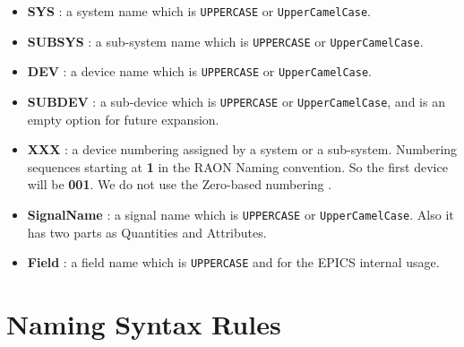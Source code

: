 \documentclass[11pt
  , a4paper
  , article
  , oneside
]{memoir}
\begin{document}
\begin{itemize}
\item \textbf{SYS}    : a system name which is \texttt{UPPERCASE} or \texttt{UpperCamelCase}. 
\item \textbf{SUBSYS} : a sub-system name which is \texttt{UPPERCASE} or \texttt{UpperCamelCase}. 
\item \textbf{DEV} : a device name which is \texttt{UPPERCASE} or \texttt{UpperCamelCase}.
\item \textbf{SUBDEV} : a sub-device which is \texttt{UPPERCASE} or \texttt{UpperCamelCase}, and is an empty option for future expansion.
\item \textbf{XXX}  : a device numbering assigned by a system or a sub-system. Numbering sequences starting at \textbf{1} in the RAON Naming convention. So the first device will be \textbf{001}. We do not use the Zero-based numbering \cite{ZERONUM}. 
\item \textbf{SignalName} : a signal name which is \texttt{UPPERCASE} or \texttt{UpperCamelCase}. Also it has two parts as Quantities and Attributes.
\item \textbf{Field} : a field name which is \texttt{UPPERCASE} and for the EPICS internal usage.
\end{itemize}

 
\chapter{Naming Syntax Rules}
\end{document}
